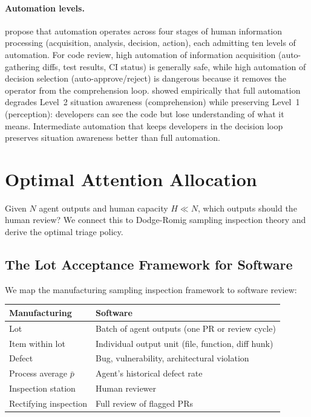 \documentclass[11pt, a4paper, copyright]{googledeepmind}
\begin{document}
\paragraph{Automation levels.} \citet{parasuraman2000model} propose that automation operates across four stages of human information processing (acquisition, analysis, decision, action), each admitting ten levels of automation. For code review, high automation of information acquisition (auto-gathering diffs, test results, CI status) is generally safe, while high automation of decision selection (auto-approve/reject) is dangerous because it removes the operator from the comprehension loop. \citet{endsley1995outofloop} showed empirically that full automation degrades Level~2 situation awareness (comprehension) while preserving Level~1 (perception): developers can see the code but lose understanding of what it means. Intermediate automation that keeps developers in the decision loop preserves situation awareness better than full automation.

\section{Optimal Attention Allocation}
\label{sec:triage}

Given $N$ agent outputs and human capacity $H \ll N$, which outputs should the human review? We connect this to Dodge-Romig sampling inspection theory \citep{dodge1929method, dodge1959sampling} and derive the optimal triage policy.

\subsection{The Lot Acceptance Framework for Software}

We map the manufacturing sampling inspection framework to software review:

\begin{center}
\small
\begin{tabular}{ll}
\toprule
\textbf{Manufacturing} & \textbf{Software} \\
\midrule
Lot & Batch of agent outputs (one PR or review cycle) \\
Item within lot & Individual output unit (file, function, diff hunk) \\
Defect & Bug, vulnerability, architectural violation \\
Process average $\bar{p}$ & Agent's historical defect rate \\
Inspection station & Human reviewer \\
Rectifying inspection & Full review of flagged PRs \\
\bottomrule
\end{tabular}
\end{center}
\end{document}
